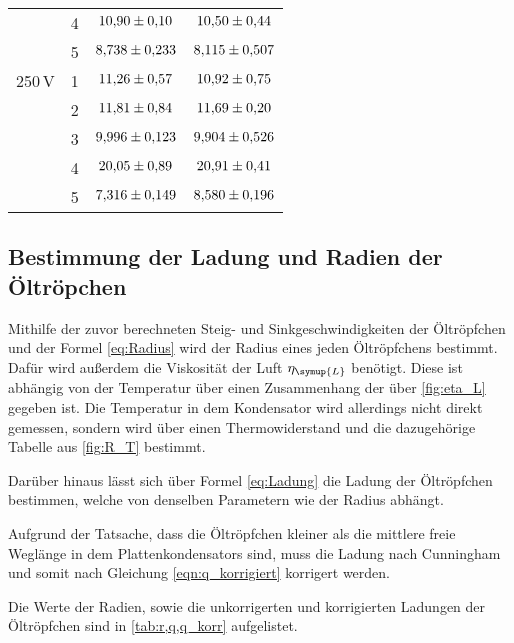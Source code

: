 \begin{table}[H]
\begin{tabular}{S S S S}
        {}          & 4 &   $\num{10.90+-0.10 }$ & $\num{10.50+-0.44 }$ \\
        {}          & 5 &   $\num{8.738+-0.233}$ & $\num{8.115+-0.507}$ \\
        {250\,V}    & 1 &   $\num{11.26+-0.57 }$ & $\num{10.92+-0.75 }$ \\
        {}          & 2 &   $\num{11.81+-0.84 }$ & $\num{11.69+-0.20 }$ \\
        {}          & 3 &   $\num{9.996+-0.123}$ & $\num{9.904+-0.526}$ \\
        {}          & 4 &   $\num{20.05+-0.89 }$ & $\num{20.91+-0.41 }$ \\
        {}          & 5 &   $\num{7.316+-0.149}$ & $\num{8.580+-0.196}$ \\ 
        \bottomrule
    \end{tabular}
  \end{table}

\subsection{Bestimmung der Ladung und Radien der Öltröpchen}
Mithilfe der zuvor berechneten Steig- und Sinkgeschwindigkeiten der Öltröpfchen und der Formel \eqref{eq:Radius}
wird der Radius eines jeden Öltröpfchens bestimmt. Dafür wird außerdem die Viskosität der Luft $\eta_{\symup{L}}$ benötigt.
Diese ist abhängig von der Temperatur über einen Zusammenhang der über \autoref{fig:eta_L} gegeben ist. Die Temperatur in 
dem Kondensator wird allerdings nicht direkt gemessen, sondern wird über einen Thermowiderstand und die dazugehörige Tabelle
aus \autoref{fig:R_T} bestimmt.

Darüber hinaus lässt sich über Formel \eqref{eq:Ladung} die Ladung der Öltröpfchen bestimmen, welche von denselben Parametern
wie der Radius abhängt.

Aufgrund der Tatsache, dass die Öltröpfchen kleiner als die mittlere freie Weglänge in dem Plattenkondensators sind, muss die
Ladung nach Cunningham und somit nach Gleichung \eqref{eqn:q_korrigiert} korrigert werden.

Die Werte der Radien, sowie die unkorrigerten und korrigierten Ladungen der Öltröpfchen sind in \autoref{tab:r,q,q_korr} 
aufgelistet.

